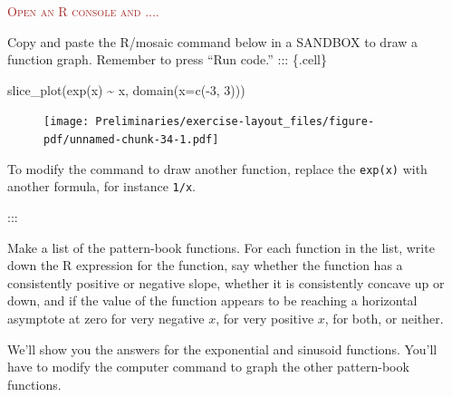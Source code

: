\documentclass[
  letterpaper,
  DIV=11,
  numbers=noendperiod,
  oneside]{article}
\newenvironment{Shaded}{\begin{snugshade}}{\end{snugshade}}
\newcommand{\AttributeTok}[1]{\textcolor[rgb]{0.40,0.45,0.13}{#1}}
\newcommand{\DecValTok}[1]{\textcolor[rgb]{0.68,0.00,0.00}{#1}}
\newcommand{\FunctionTok}[1]{\textcolor[rgb]{0.28,0.35,0.67}{#1}}
\newcommand{\NormalTok}[1]{\textcolor[rgb]{0.00,0.23,0.31}{#1}}
\newcommand{\SpecialCharTok}[1]{\textcolor[rgb]{0.37,0.37,0.37}{#1}}
\newenvironment{scaffolding}%
{%
\textcolor{brown}{\hrulefill}%
  \par\vspace{.3\baselineskip}%
  \textcolor{brown}{\scshape Open an R console and ....}%
  \par\vspace{\baselineskip}%
}%
{\textcolor{brown}{\hrulefill}}
\begin{document}
\begin{multicols}{2}
\begin{scaffolding}

Copy and paste the R/mosaic command below in a SANDBOX to draw a
function graph. Remember to press ``Run code.'' ::: \{.cell\}

\begin{Shaded}
\begin{Highlighting}[]
\FunctionTok{slice\_plot}\NormalTok{(}\FunctionTok{exp}\NormalTok{(x) }\SpecialCharTok{\textasciitilde{}}\NormalTok{ x, }\FunctionTok{domain}\NormalTok{(}\AttributeTok{x=}\FunctionTok{c}\NormalTok{(}\SpecialCharTok{{-}}\DecValTok{3}\NormalTok{, }\DecValTok{3}\NormalTok{)))}
\end{Highlighting}
\end{Shaded}

\begin{figure}[H]

{\centering \texttt{[image: Preliminaries/exercise-layout\_files/figure-pdf/unnamed-chunk-34-1.pdf]}

}

\end{figure}

\end{scaffolding}

To modify the command to draw another function, replace the
\texttt{exp(x)} with another formula, for instance \texttt{1/x}.

:::

Make a list of the pattern-book functions. For each function in the
list, write down the R expression for the function, say whether the
function has a consistently positive or negative slope, whether it is
consistently concave up or down, and if the value of the function
appears to be reaching a horizontal asymptote at zero for very negative
\(x\), for very positive \(x\), for both, or neither.

We'll show you the answers for the exponential and sinusoid functions.
You'll have to modify the computer command to graph the other
pattern-book functions.


\end{multicols}
\end{document}
